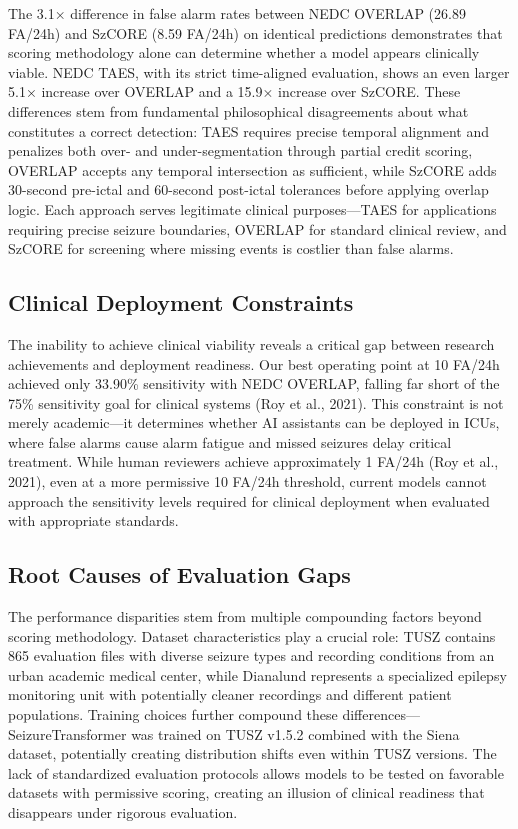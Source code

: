 \documentclass[
  10pt,
]{article}
\begin{document}
The 3.1× difference in false alarm rates between NEDC OVERLAP (26.89
FA/24h) and SzCORE (8.59 FA/24h) on identical predictions demonstrates
that scoring methodology alone can determine whether a model appears
clinically viable. NEDC TAES, with its strict time-aligned evaluation,
shows an even larger 5.1× increase over OVERLAP and a 15.9× increase
over SzCORE. These differences stem from fundamental philosophical
disagreements about what constitutes a correct detection: TAES requires
precise temporal alignment and penalizes both over- and
under-segmentation through partial credit scoring, OVERLAP accepts any
temporal intersection as sufficient, while SzCORE adds 30-second
pre-ictal and 60-second post-ictal tolerances before applying overlap
logic. Each approach serves legitimate clinical purposes---TAES for
applications requiring precise seizure boundaries, OVERLAP for standard
clinical review, and SzCORE for screening where missing events is
costlier than false alarms.

\hypertarget{clinical-deployment-constraints}{%
\subsection{Clinical Deployment
Constraints}\label{clinical-deployment-constraints}}

The inability to achieve clinical viability reveals a critical gap
between research achievements and deployment readiness. Our best
operating point at 10 FA/24h achieved only 33.90\% sensitivity with NEDC
OVERLAP, falling far short of the 75\% sensitivity goal for clinical
systems (Roy et al., 2021). This constraint is not merely academic---it
determines whether AI assistants can be deployed in ICUs, where false
alarms cause alarm fatigue and missed seizures delay critical treatment.
While human reviewers achieve approximately 1 FA/24h (Roy et al., 2021),
even at a more permissive 10 FA/24h threshold, current models cannot
approach the sensitivity levels required for clinical deployment when
evaluated with appropriate standards.

\hypertarget{root-causes-of-evaluation-gaps}{%
\subsection{Root Causes of Evaluation
Gaps}\label{root-causes-of-evaluation-gaps}}

The performance disparities stem from multiple compounding factors
beyond scoring methodology. Dataset characteristics play a crucial role:
TUSZ contains 865 evaluation files with diverse seizure types and
recording conditions from an urban academic medical center, while
Dianalund represents a specialized epilepsy monitoring unit with
potentially cleaner recordings and different patient populations.
Training choices further compound these differences---SeizureTransformer
was trained on TUSZ v1.5.2 combined with the Siena dataset, potentially
creating distribution shifts even within TUSZ versions. The lack of
standardized evaluation protocols allows models to be tested on
favorable datasets with permissive scoring, creating an illusion of
clinical readiness that disappears under rigorous evaluation.
\end{document}
